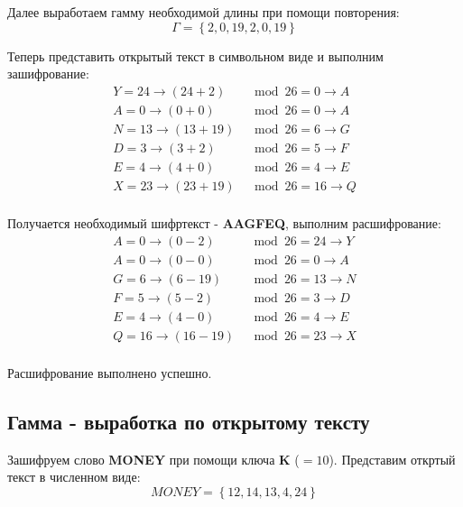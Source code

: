 \documentclass[a4paper]{article}
\begin{document}
  Далее выработаем гамму необходимой длины при помощи повторения:
  \begin{equation}
    \Gamma = \left\{2, 0, 19, 2, 0, 19\right\}
  \end{equation}

  Теперь представить открытый текст в символьном виде и выполним зашифрование:
  \begin{equation}
    \begin{aligned}
      Y = 24 \rightarrow (24 + 2) &\mod 26 = 0 \rightarrow A \\
      A = 0 \rightarrow (0 + 0) &\mod 26 = 0 \rightarrow A \\
      N = 13 \rightarrow (13 + 19) &\mod 26 = 6 \rightarrow G \\
      D = 3 \rightarrow (3 + 2) &\mod 26 = 5 \rightarrow F \\
      E = 4 \rightarrow (4 + 0) &\mod 26 = 4 \rightarrow E \\
      X = 23 \rightarrow (23 + 19) &\mod 26 = 16 \rightarrow Q \\
    \end{aligned}
  \end{equation}

  Получается необходимый шифртекст - \textbf{AAGFEQ}, выполним расшифрование:
  \begin{equation}
    \begin{aligned}
      A = 0 \rightarrow (0 - 2) &\mod 26 = 24 \rightarrow Y \\
      A = 0 \rightarrow (0 - 0) &\mod 26 = 0 \rightarrow A \\
      G = 6 \rightarrow (6 - 19) &\mod 26 = 13 \rightarrow N \\
      F = 5 \rightarrow (5 - 2) &\mod 26 = 3 \rightarrow D \\
      E = 4 \rightarrow (4 - 0) &\mod 26 = 4 \rightarrow E \\
      Q = 16 \rightarrow (16 - 19) &\mod 26 = 23 \rightarrow X \\
    \end{aligned}
  \end{equation}

  Расшифрование выполнено успешно.

  \subsection{Гамма - выработка по открытому тексту}

  Зашифруем слово \textbf{MONEY} при помощи ключа \textbf{K} ($= 10$).
  Представим откртый текст в численном виде:
  \begin{equation}
    MONEY = \left\{12, 14, 13, 4, 24\right\}
  \end{equation}
\end{document}
